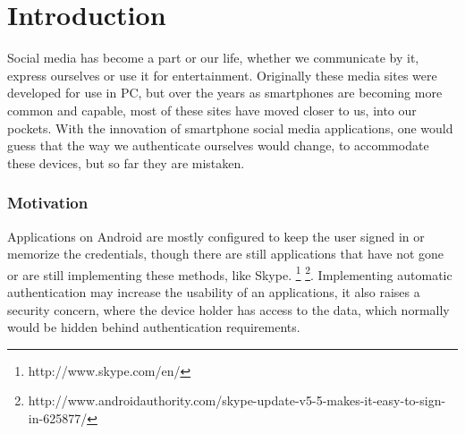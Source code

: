 

\chapter{Introduction}

\ifpdf
    \graphicspath{{1_introduction/figures/PNG/}{1_introduction/figures/PDF/}{1_introduction/figures/}}
\else
    \graphicspath{{1_introduction/figures/EPS/}{1_introduction/figures/}}
\fi





Social media has become a part or our life, whether we communicate by it, express ourselves or use it for entertainment. Originally these media sites were developed for use in PC, but over the years as smartphones are becoming more common and capable, most of these sites have moved closer to us, into our pockets. With the innovation of smartphone social media applications, one would guess that the way we authenticate ourselves would change, to accommodate these devices, but so far they are mistaken.


\subsection{Motivation}
Applications on Android are mostly configured to keep the user signed in or memorize the credentials, though there are still applications that have not gone or are still implementing these methods, like Skype. \footnote{http://www.skype.com/en/} \footnote{http://www.androidauthority.com/skype-update-v5-5-makes-it-easy-to-sign-in-625877/}. Implementing automatic authentication may increase the usability of an applications, it also raises a security concern, where the device holder has access to the data, which normally would be hidden behind authentication requirements.

